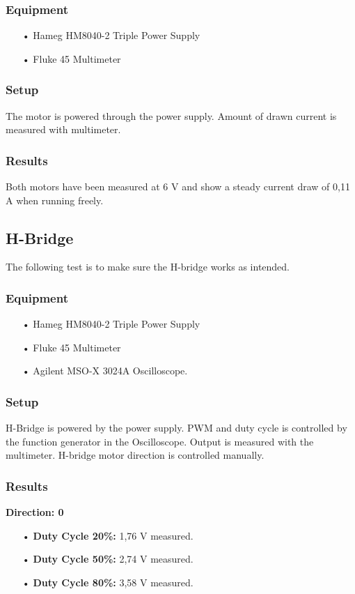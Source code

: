 \subsubsection{Equipment}
\begin{enumerate}
	\item[•]Hameg HM8040-2 Triple Power Supply
	\item[•]Fluke 45 Multimeter
\end{enumerate}

\subsubsection{Setup}
The motor is powered through the power supply.
Amount of drawn current is measured with multimeter.

\subsubsection{Results}
Both motors have been measured at 6 V and show a steady current draw of 0,11 A when running freely.


\subsection{H-Bridge}
The following test is to make sure the H-bridge works as intended.

\subsubsection{Equipment}
\begin{enumerate}
	\item[•]Hameg HM8040-2 Triple Power Supply
	\item[•]Fluke 45 Multimeter
	\item[•]Agilent MSO-X 3024A Oscilloscope.
\end{enumerate}

\subsubsection{Setup}
H-Bridge is powered by the power supply.
PWM and duty cycle is controlled by the function generator in the Oscilloscope.
Output is measured with the multimeter.
H-bridge motor direction is controlled manually.

\subsubsection{Results}
\textbf{Direction: 0}
\begin{enumerate}
	\item[•]\textbf{Duty Cycle 20\%:} 1,76 V measured.
	\item[•]\textbf{Duty Cycle 50\%:} 2,74 V measured.
	\item[•]\textbf{Duty Cycle 80\%:} 3,58 V measured.
\end{enumerate}


